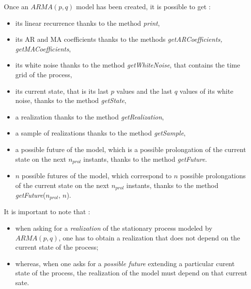 \renewcommand{\filename}{docUC_StocProc_ARMA_Manipulation.tex}
\renewcommand{\filetitle}{UC : Manipulation of an ARMA model}

\HeaderIIILevel

\label{ARMAManipulation}


Once an $ARMA(p,q)$ model has been created, it is possible to get :
\begin{itemize}
  \item  its linear recurrence thanks to the method \emph{print},
  \item  its AR and MA coefficients thanks to the methods \emph{getARCoefficients, getMACoefficients},
  \item  its white noise thanks to the method \emph{getWhiteNoise}, that contains the time grid of the process,
  \item  its current state, that is its last $p$ values and the last $q$ values of its white noise,  thanks to the method \emph{getState},
  \item   a realization thanks to the method \emph{getRealization},
  \item  a sample of realizations thanks to the method \emph{getSample},
  \item  a possible future of the model, which is a possible prolongation of the current state on the next $n_{prol}$ instants, thanks to the method \emph{getFuture}.
  \item   $n$ possible futures of the model, which correspond to  $n$ possible prolongations of the current state on the next $n_{prol}$ instants, thanks to the method \emph{getFuture}($n_{prol}$, $n$).
\end{itemize}


It is important to note that :
\begin{itemize}
  \item when asking for a \emph{realization} of the stationary process modeled by $ARMA(p,q)$, one has to obtain a realization that does not depend on the current state of the process;
  \item whereas, when one asks for a \emph{possible future} extending a particular curent state of the process, the realization of the model must depend on that current sate.
\end{itemize}

